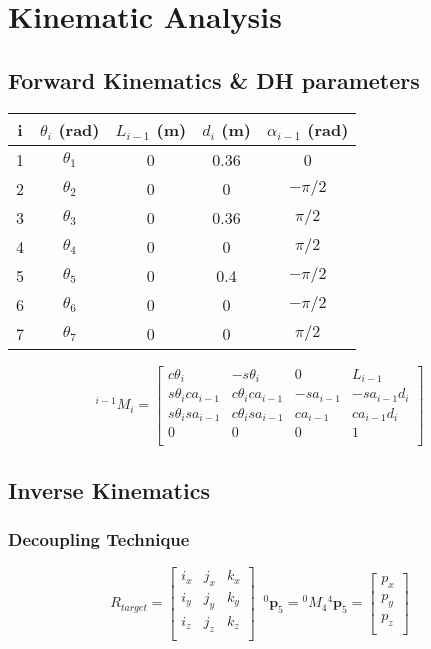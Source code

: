 \section{Kinematic Analysis}


\subsection{Forward Kinematics \& DH parameters}

\begin{center}
\begin{tabular}{ |c|c|c|c|c| } 
\hline
i & $θ_i$ (rad) & $L_{i-1}$ (m) & $d_i$ (m) & $α_{i-1}$ (rad) \\
\hline
1 & $θ_1$ & 0 & 0.36 & 0 \\
2 & $θ_2$ & 0 & 0 & $-π/2$ \\
3 & $θ_3$ & 0 & 0.36 & $π/2$ \\
4 & $θ_4$ & 0 & 0 & $π/2$\\
5 & $θ_5$ & 0 & 0.4 & $-π/2$ \\
6 & $θ_6$ & 0 & 0 & $-π/2$ \\
7 & $θ_7$ & 0 & 0 & $π/2$ \\
\hline
\end{tabular}
\end{center}

\[
^{i-1}M_i = 
\begin{bmatrix}
c\theta_i & -s\theta_i & 0 & L_{i-1} \\
s\theta_ica_{i-1} & c\theta_ica_{i-1} & -sa_{i-1} & -sa_{i-1}d_i \\
s\theta_isa_{i-1} & c\theta_isa_{i-1} & ca_{i-1} & ca_{i-1}d_i \\
0 & 0 & 0 & 1\\
\end{bmatrix}
\]


\subsection{Inverse Kinematics}

\subsubsection{Decoupling Technique}

\[
R_{target} = 
\begin{bmatrix}
i_x & j_x & k_x\\
i_y & j_y & k_y\\
i_z & j_z & k_z\\
\end{bmatrix}
\;\;
{}^0\mathbf{p}_5 = {}^0M_4 {}^4\mathbf{p}_5 = \begin{bmatrix} p_x \\ p_y \\ p_z \\ \end{bmatrix}
\]

